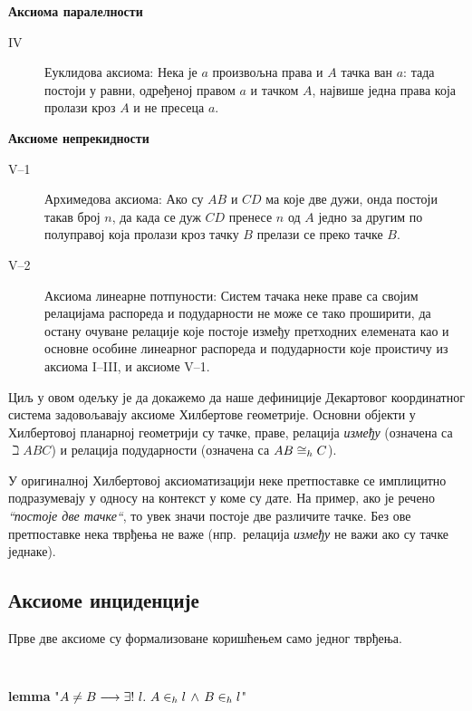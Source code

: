 \noindent \textbf{Аксиома паралелности}

\begin{description}
\item[IV] Еуклидова аксиома: Нека је $a$ произвољна права и $A$ тачка
  ван $a$: тада постоји у равни, одређеној правом $a$ и тачком $A$,
  највише једна права која пролази кроз $A$ и не пресеца $a$.
\end{description}

\noindent \textbf{Аксиоме непрекидности}

\begin{description}
\item[V--1] Архимедова аксиома: Ако су $AB$ и $CD$ ма које две дужи,
  онда постоји такав број $n$, да када се дуж $CD$ пренесе $n$ од $A$
  једно за другим по полуправој која пролази кроз тачку $B$ прелази се
  преко тачке $B$.
\item[V--2] Аксиома линеарне потпуности: Систем тачака неке праве са
  својим релацијама распореда и подударности не може се тако
  проширити, да остану очуване релације које постоје између претходних
  елемената као и основне особине линеарног распореда и подударности
  које проистичу из аксиома I--III, и аксиоме V--1.
\end{description}  

Циљ у овом одељку је да докажемо да наше дефиниције Декартовог
координатног система задовољавају аксиоме Хилбертове
геометрије. Основни објекти у Хилбертовој планарној геометрији су
тачке, праве, релација \emph{између} (означена са $\beth{A}{B}{C}$) и
релација подударности (означена са $\congrh{A}{B}{C}$).


У оригиналној Хилбертовој аксиоматизацији \cite{hilbert} неке
претпоставке се имплицитно подразумевају у односу на контекст у коме
су дате. На пример, ако је речено \emph{``постоје две тачке``}, то
увек значи постоје две различите тачке. Без ове претпоставке нека
тврђења не важе (нпр.~релација \emph{између} не важи ако су тачке
једнаке).


\subsection{Аксиоме инциденције}

Прве две аксиоме су формализоване коришћењем само једног тврђења.
{\tt
\begin{tabbing}
\textbf{lemma} "$A \neq B \longrightarrow \exists!\ l.\ A \in_h l \,\wedge\, B \in_h l$"
\end{tabbing}
}

